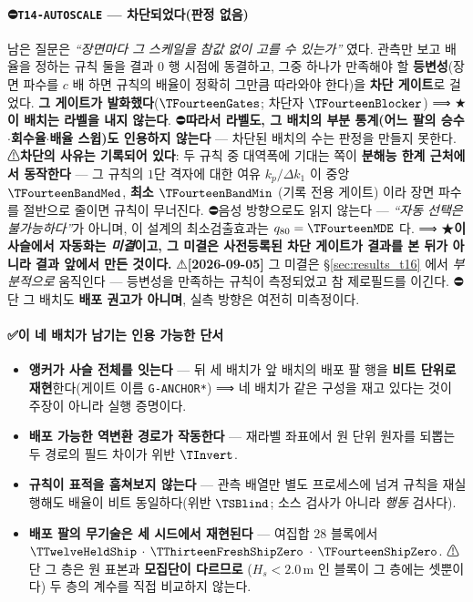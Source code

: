 \documentclass[11pt]{report}
\numberwithin{equation}{chapter}
\numberwithin{figure}{chapter}
\numberwithin{table}{chapter}
\begin{document}
\paragraph{⛔\texttt{T14-AUTOSCALE} --- \textbf{차단되었다}(판정 없음)}
남은 질문은 \emph{``장면마다 그 스케일을 참값 없이 고를 수 있는가''} 였다. 관측만 보고
배율을 정하는 규칙 둘을 결과 $0$ 행 시점에 동결하고, 그중 하나가 만족해야 할
\textbf{등변성}(장면 파수를 $c$ 배 하면 규칙의 배율이 정확히 그만큼 따라와야 한다)을
\textbf{차단 게이트}로 걸었다. \textbf{그 게이트가 발화했다}($\TFourteenGates$;
차단자 $\TFourteenBlocker$) ⟹ ★\textbf{이 배치는 라벨을 내지 않는다}.
⛔\textbf{따라서 라벨도, 그 배치의 부분 통계(어느 팔의 승수$\cdot$회수율$\cdot$배율 스윕)도
인용하지 않는다} --- 차단된 배치의 수는 판정을 만들지 못한다.
⚠\textbf{차단의 사유는 기록되어 있다}: 두 규칙 중 대역폭에 기대는 쪽이
\textbf{분해능 한계 근처에서 동작한다} --- 그 규칙의 $1$단 격자에 대한 여유
$k_p/\Delta k_1$ 이 중앙 $\TFourteenBandMed$, \textbf{최소 $\TFourteenBandMin$}
(기록 전용 게이트) 이라 장면 파수를 절반으로 줄이면 규칙이 무너진다.
⛔음성 방향으로도 읽지 않는다 --- \emph{``자동 선택은 불가능하다''}가 아니며, 이 설계의
최소검출효과는 $q_{80} = \TFourteenMDE$ 다.
⟹ ★\textbf{이 사슬에서 자동화는 \emph{미결}이고, 그 미결은 사전등록된 차단 게이트가
\textbf{결과를 본 뒤가 아니라 결과 앞에서} 만든 것이다.}
⚠\textbf{[2026-09-05]} 그 미결은 \S\ref{sec:results_t16} 에서 \emph{부분적으로}
움직인다 --- 등변성을 만족하는 규칙이 측정되었고 참 제로필드를 이긴다. ⛔단 그 배치도
\textbf{배포 권고가 아니며}, 실측 방향은 여전히 미측정이다.

\paragraph{✅이 네 배치가 남기는 인용 가능한 단서}
\begin{itemize}
  \item \textbf{앵커가 사슬 전체를 잇는다} --- 뒤 세 배치가 앞 배치의 배포 팔 행을
        \textbf{비트 단위로 재현}한다(게이트 이름 \texttt{G-ANCHOR*}) ⟹ 네 배치가
        같은 구성을 재고 있다는 것이 주장이 아니라 실행 증명이다.
  \item \textbf{배포 가능한 역변환 경로가 작동한다} --- 재라벨 좌표에서 원 단위 원자를
        되뽑는 두 경로의 필드 차이가 위반 $\TInvert$.
  \item \textbf{규칙이 표적을 훔쳐보지 않는다} --- 관측 배열만 별도 프로세스에 넘겨
        규칙을 재실행해도 배율이 비트 동일하다(위반 $\TSBlind$; 소스 검사가 아니라
        \emph{행동} 검사다).
  \item \textbf{배포 팔의 무기술은 세 시드에서 재현된다} --- 여집합 $28$ 블록에서
        $\TTwelveHeldShip$ $\cdot$ $\TThirteenFreshShipZero$ $\cdot$
        $\TFourteenShipZero$. ⚠단 그 층은 원 표본과 \textbf{모집단이 다르므로}
        ($H_s < 2.0$\,m 인 블록이 그 층에는 셋뿐이다) 두 층의 계수를 직접 비교하지 않는다.
\end{itemize}
\end{document}
